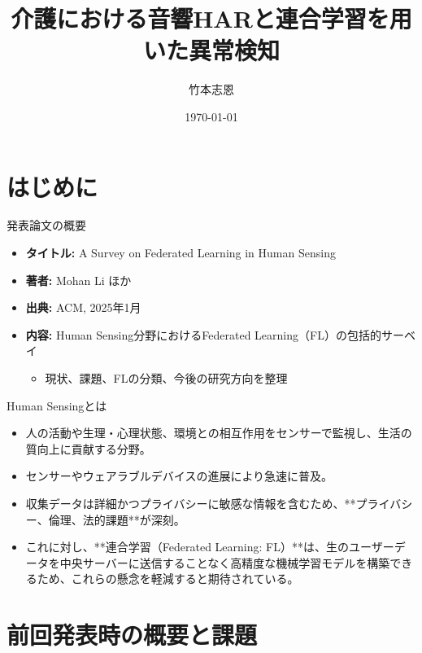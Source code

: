 \documentclass[unicode,12pt,aspectratio=169, dvipdfmx]{beamer}
\title{介護における音響HARと連合学習を用いた異常検知}
\author{竹本志恩}
\institute{INIAD}
\date{\today}
\begin{document}
\frame{\maketitle}
\section{はじめに}

\begin{frame}{発表論文の概要}
\begin{itemize}
    \item \textbf{タイトル:} A Survey on Federated Learning in Human Sensing
    \item \textbf{著者:} Mohan Li ほか
    \item \textbf{出典:} ACM, 2025年1月
    \item \textbf{内容:} Human Sensing分野におけるFederated Learning（FL）の包括的サーベイ
    \begin{itemize}
        \item 現状、課題、FLの分類、今後の研究方向を整理
    \end{itemize}
\end{itemize}
\end{frame}

\begin{frame}{Human Sensingとは}
\begin{itemize}
    \item 人の活動や生理・心理状態、環境との相互作用をセンサーで監視し、生活の質向上に貢献する分野。
    \item センサーやウェアラブルデバイスの進展により急速に普及。
    \item 収集データは詳細かつプライバシーに敏感な情報を含むため、**プライバシー、倫理、法的課題**が深刻。
    \item これに対し、**連合学習（Federated Learning: FL）**は、生のユーザーデータを中央サーバーに送信することなく高精度な機械学習モデルを構築できるため、これらの懸念を軽減すると期待されている。
\end{itemize}
\end{frame}

\section{前回発表時の概要と課題}
\end{document}
